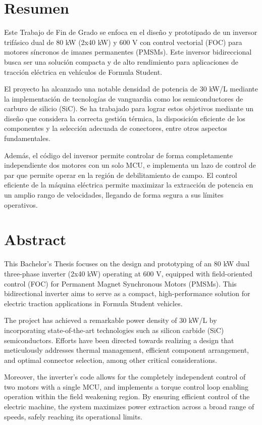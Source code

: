 \chapter*{Resumen}
Este Trabajo de Fin de Grado se enfoca en el diseño y prototipado de un inversor trifásico dual de 80 kW (2x40 kW) y 600 V con control vectorial (FOC) para motores síncronos de imanes permanentes (PMSMs). Este inversor bidireccional busca ser una solución compacta y de alto rendimiento para aplicaciones de tracción eléctrica en vehículos de Formula Student.

El proyecto ha alcanzado una notable densidad de potencia de 30 kW/L mediante la implementación de tecnologías de vanguardia como los semiconductores de carburo de silicio (SiC). Se ha trabajado para lograr estos objetivos mediante un diseño que considera la correcta gestión térmica, la disposición eficiente de los componentes y la selección adecuada de conectores, entre otros aspectos fundamentales.

Además, el código del inversor permite controlar de forma completamente independiente dos motores con un solo MCU, e implementa un lazo de control de par que permite operar en la región de debilitamiento de campo. El control eficiente de la máquina eléctrica permite maximizar la extracción de potencia en un amplio rango de velocidades, llegando de forma segura a sus límites operativos.

\chapter*{Abstract}
This Bachelor's Thesis focuses on the design and prototyping of an 80 kW dual three-phase inverter (2x40 kW) operating at 600 V, equipped with field-oriented control (FOC) for Permanent Magnet Synchronous Motors (PMSMs). This bidirectional inverter aims to serve as a compact, high-performance solution for electric traction applications in Formula Student vehicles.

The project has achieved a remarkable power density of 30 kW/L by incorporating state-of-the-art technologies such as silicon carbide (SiC) semiconductors. Efforts have been directed towards realizing a design that meticulously addresses thermal management, efficient component arrangement, and optimal connector selection, among other critical considerations.

Moreover, the inverter's code allows for the completely independent control of two motors with a single MCU, and implements a torque control loop enabling operation within the field weakening region. By ensuring efficient control of the electric machine, the system maximizes power extraction across a broad range of speeds, safely reaching its operational limits.